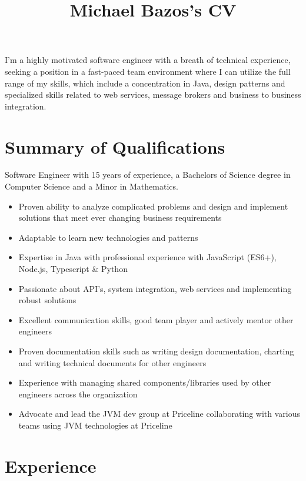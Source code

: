 \documentclass[a4paper,online]{adcv}
\title{Michael Bazos’s CV}
\begin{document}
I’m a highly motivated software engineer with a breath of technical experience, seeking a position in a fast-paced team environment where I can utilize the full range of my skills, which include a concentration in Java, design patterns and specialized skills related to web services, message brokers and business to business integration.

\section{Summary of Qualifications}

\begin{adcvtabletwo}
Software Engineer with 15 years of experience, a Bachelors of Science degree in Computer Science and a Minor in Mathematics.
  \begin{itemize}
    \item Proven ability to analyze complicated problems and design and implement solutions that meet ever changing business requirements
    \item Adaptable to learn new technologies and patterns
    \item Expertise in Java with professional experience with JavaScript (ES6+), Node.js, Typescript \& Python
    \item Passionate about API's, system integration, web services and implementing robust solutions
    \item Excellent communication skills, good team player and actively mentor other engineers
    \item Proven documentation skills such as writing design documentation, charting and writing technical documents for other engineers
    \item Experience with managing shared components/libraries used by other engineers across the organization
    \item Advocate and lead the JVM dev group at Priceline collaborating with various teams using JVM technologies at Priceline
  \end{itemize}
\end{adcvtabletwo}

\section{Experience}
\end{document}
